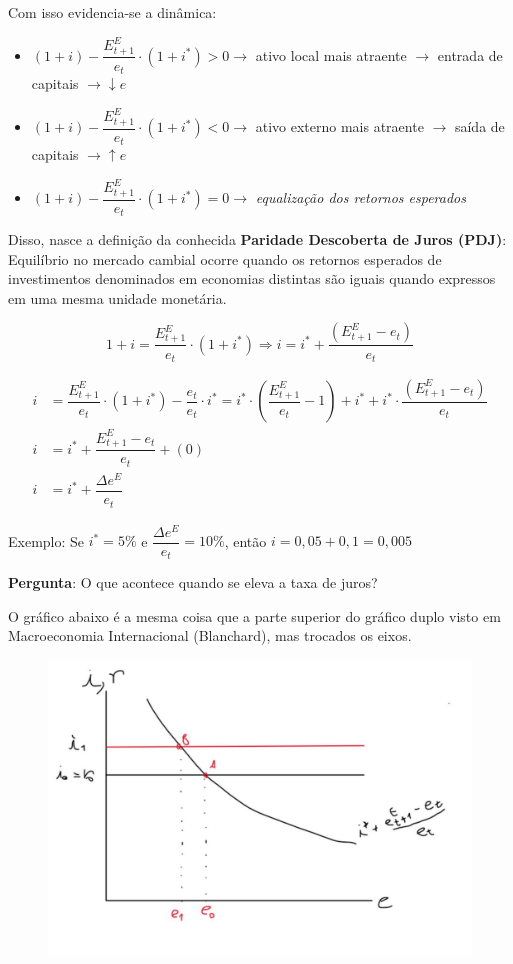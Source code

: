 \documentclass[a4paper,12pt]{article}[abntex2]
\begin{document}
Com isso evidencia-se a dinâmica:
\begin{itemize}
  \item $(1+i) - \dfrac{E_{t+1}^E}{e_t} \cdot (1+i^*) > 0 \rightarrow$ ativo local mais atraente $\rightarrow$ entrada de capitais $\rightarrow \downarrow e$
  \item $(1+i) - \dfrac{E_{t+1}^E}{e_t} \cdot (1+i^*) < 0 \rightarrow$ ativo externo mais atraente $\rightarrow$ saída de capitais $\rightarrow \uparrow e$
  \item $(1+i) - \dfrac{E_{t+1}^E}{e_t} \cdot (1+i^*) = 0 \rightarrow$ \textit{equalização dos retornos esperados}
\end{itemize}

Disso, nasce a definição da conhecida \textbf{Paridade Descoberta de Juros (PDJ)}: Equilíbrio no mercado cambial ocorre quando os retornos esperados de investimentos denominados em economias distintas são iguais quando expressos em uma mesma unidade monetária.

\begin{equation*}
1 + i = \dfrac{E_{t+1}^E}{e_t} \cdot (1 + i^*) \Rightarrow i = i^* + \dfrac{(E_{t+1}^E - e_t)}{e_t}
\end{equation*}

\begin{align*}
i &= \dfrac{E_{t+1}^E}{e_t} \cdot (1 + i^*) - \dfrac{e_t}{e_t} \cdot i^* = i^* \cdot \left( \dfrac{E_{t+1}^E}{e_t} - 1 \right) + i^* + i^* \cdot \dfrac{(E_{t+1}^E - e_t)}{e_t} \\
i &= i^* + \dfrac{E_{t+1}^E - e_t}{e_t} + (0) \\
i &= i^* + \dfrac{\Delta e^E}{e_t}
\end{align*}

Exemplo: Se $i^* = 5\%$ e $\dfrac{\Delta e^E}{e_t} = 10\%$, então $i = 0{,}05 + 0{,}1 = 0{,}005$

\textbf{Pergunta}: O que acontece quando se eleva a taxa de juros?

O gráfico abaixo é a mesma coisa que a parte superior do gráfico duplo visto em Macroeconomia Internacional (Blanchard), mas trocados os eixos.

\begin{figure}[H]
    \centering
    \includegraphics[width=0.7\linewidth]{Imagens/a22i3.png}
\end{figure}
\end{document}
